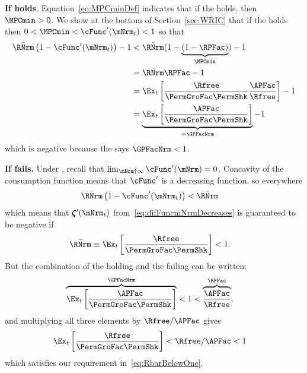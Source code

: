 \documentclass[\econtexRoot/BufferStockTheory]{subfiles}
\begin{document}
\textbf{If {\RIC} holds}. Equation~\eqref{eq:MPCminDef} indicates that if the {\RIC} holds, then $\MPCmin >0$.  We show at the bottom of Section~\ref{sec:WRIC} that if the {\RIC} holds then $0 < \MPCmin < \cFunc^{\prime}(\mNrm_{t}) < 1$ so that 
\begin{align*}
  \bar{\RNrm}\left(1-\cFunc^{\prime}({\mNrm}_t)\right) - 1 & <  \bar{\RNrm}(1-\underbrace{(1-\RPFac)}_{\MPCmin}) - 1  \\
                                                            & = \bar{\RNrm}\RPFac - 1 \\
                                                            & = \Ex_{t}\left[\frac{\Rfree}{\PermGroFac \PermShk}\frac{\APFac}{\Rfree}\right] - 1 \\
                                                            & = \underbrace{\Ex_{t}\left[\frac{\APFac}{\PermGroFac \PermShk}\right]}_{= \GPFacNrm} - 1 
\end{align*}
which is negative because the {\GICNrm} says $\GPFacNrm < 1$.  

\textbf{If {\RIC} fails.}
Under \cncl{\RIC}, recall that $\lim_{\mNrm \uparrow \infty} \cFunc^{\prime}(\mNrm) = 0$.  Concavity of the consumption function means that $\cFunc^{\prime}$ is a decreasing function, so everywhere 
\begin{align*}
  \bar{\RNrm}\left(1-\cFunc^{\prime}({\mNrm}_t)\right) & < \bar{\RNrm}
\end{align*}
which means that $\difFunc^{\prime}(\mNrm_{t})$ from~\eqref{eq:difFuncmNrmDecreases} is guaranteed to be negative if
\begin{equation}\begin{gathered}\begin{aligned}
  \bar{\RNrm} \equiv \Ex_{t}\left[\frac{\Rfree}{\PermGroFac \PermShk}\right] & < 1  \label{eq:RbarBelowOne}.
\end{aligned}\end{gathered}\end{equation}
But the combination of the {\GICNrm} holding and the {\RIC} failing can be written:
\begin{align*}
  \overbrace{\Ex_{t}\left[\frac{\APFac}{\PermGroFac \PermShk}\right]}^{\GPFacNrm} & < 1 < \overbrace{\frac{\APFac}{\Rfree}}^{{\RPFac}},
\end{align*}
and multiplying all three elements by $\Rfree/\APFac$ gives 
\begin{align*}
  \Ex_{t}\left[\frac{\Rfree}{\PermGroFac \PermShk}\right] & < \Rfree/\APFac < 1
\end{align*}
which satisfies our requirement in~\eqref{eq:RbarBelowOne}.
\end{document}
